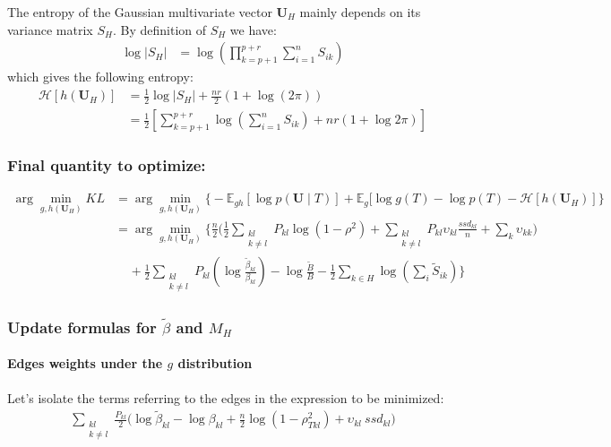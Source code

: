 \documentclass[11pt,a4paper]{article}
\newcommand{\argmin}{\arg\!\min}
\newcommand{\entr}{\mathcal{H}}
\newcommand{\Ubf}{\boldsymbol{U}}
\newcommand{\Esp}{\mathds{E}}
\begin{document}
 The entropy of the Gaussian multivariate vector $\Ubf_H$ mainly depends on its variance matrix $S_H$. By definition of $S_H$ we have:
 \begin{align*}
 \log |S_H| &= \log(\prod_{k=p+1}^{p+r} \sum_{i=1}^n S_{ik})
\end{align*}
which gives the following entropy:
\begin{align*}
\entr[h(\Ubf_H)]&= \frac{1}{2} \log |S_H| + \frac{nr}{2}(1+\log(2\pi))\\
 &=\frac{1}{2}\left[ \sum_{k=p+1}^{p+r} \log\left(\sum_{i=1}^n S_{ik}\right)+ nr(1+\log 2\pi )\right]
\end{align*}

\subsubsection{Final quantity to optimize:}
\begin{align*}
\argmin_{g,h(\Ubf_H)} KL  &=\argmin_{g,h(\Ubf_H)}  \Big\{-\Esp_{gh}[\log p(\Ubf \mid T) ] + \Esp_g[\log g(T) - \log p(T)-\entr[h(\Ubf_H)]\Big\}\\
&= \argmin_{g,h(\Ubf_H)}  \bigg\{ \frac{n}{2}\Big(\frac{1}{2}\sum _{\substack{kl\\ k \neq l}} P_{kl} \log (1-\rho^2) +  \sum_{\substack{kl\\ k \neq l}} P_{kl} \upsilon_{kl} \frac{ssd_{kl}}{n} +  \sum_{k} \upsilon_{kk} \Big)\\
& \;\;\;\; + \frac{1}{2}\sum_{\substack{kl\\ k\neq l}}P_{kl} \left(\log \frac{\widetilde{\beta}_{kl}}{{\beta}_{kl}}\right) - \log \frac{\widetilde{B}}{B} -\frac{1}{2}\sum_{k\in H} \log\left(\sum_i \widetilde{S}_{ik}\right) \bigg\}
\end{align*}
 
 
 \subsubsection{Update formulas for $\widetilde{\beta}$ and $M_H$ }

\paragraph{Edges weights under the $g$ distribution \\}
Let's isolate the terms referring to the edges in the expression to be minimized:
\begin{align*}
  \sum_{\substack{kl\\ k \neq l}} \frac{P_{kl}}{2}\Big(\log \widetilde{\beta}_{kl} - \log \beta_{kl} + \frac{n}{2} \log (1-\rho_{Tkl}^2) + \upsilon_{kl}\: ssd_{kl} \Big)   
\end{align*}
\end{document}
